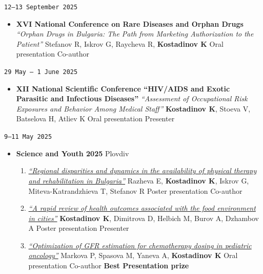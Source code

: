 \documentclass[
  10.5pt,
  a4paper,
  DIV=11,
  numbers=noendperiod]{scrartcl}
\providecommand{\tightlist}{%
  \setlength{\itemsep}{0pt}\setlength{\parskip}{0pt}}
\let\oldtexttt\texttt
\renewcommand{\texttt}[1]{{\color{cvbronze}\small\oldtexttt{#1}}}
\begin{document}
\texttt{12–13\ September\ 2025}

\begin{itemize}
\tightlist
\item
  \textbf{XVI National Conference on Rare Diseases and Orphan Drugs}
  \textbar{} \emph{``Orphan Drugs in Bulgaria: The Path from Marketing
  Authorization to the Patient''} \textbar{} Stefanov R, Iskrov G,
  Raycheva R, \textbf{Kostadinov K} \textbar{} Oral presentation
  \textbar{} Co-author
\end{itemize}

\texttt{29\ May\ –\ 1\ June\ 2025}

\begin{itemize}
\tightlist
\item
  \textbf{XII National Scientific Conference ``HIV/AIDS and Exotic
  Parasitic and Infectious Diseases''} \textbar{} \emph{``Assessment of
  Occupational Risk Exposures and Behavior Among Medical Staff''}
  \textbar{} \textbf{Kostadinov K}, Stoeva V, Batselova H, Atliev K
  \textbar{} Oral presentation \textbar{} Presenter
\end{itemize}

\texttt{9–11\ May\ 2025}

\begin{itemize}
\tightlist
\item
  \textbf{Science and Youth 2025} \textbar{} Plovdiv

  \begin{enumerate}
  \def\labelenumi{\arabic{enumi}.}
  \tightlist
  \item
    \emph{\href{https://asclepius.bg/cnm/wp-content/uploads/2025/05/SY-DMS-2025-abstracts.pdf}{``Regional
    disparities and dynamics in the availability of physical therapy and
    rehabilitation in Bulgaria''}} \textbar{} Razheva E,
    \textbf{Kostadinov K}, Iskrov G, Miteva-Katrandzhieva T, Stefanov R
    \textbar{} Poster presentation \textbar{} Co-author
  \item
    \emph{\href{https://asclepius.bg/cnm/wp-content/uploads/2025/05/SY-DMS-2025-abstracts.pdf}{``A
    rapid review of health outcomes associated with the food environment
    in cities''}} \textbar{} \textbf{Kostadinov K}, Dimitrova D, Helbich
    M, Burov A, Dzhambov A \textbar{} Poster presentation \textbar{}
    Presenter
  \item
    \emph{\href{https://asclepius.bg/cnm/wp-content/uploads/2025/05/SY-DMS-2025-abstracts.pdf}{``Optimization
    of GFR estimation for chemotherapy dosing in pediatric oncology''}}
    \textbar{} Markova P, Spasova M, Yaneva A, \textbf{Kostadinov K}
    \textbar{} Oral presentation \textbar{} Co-author \textbar{}
    \textbf{Best Presentation prize}
  \end{enumerate}
\end{itemize}
\end{document}
